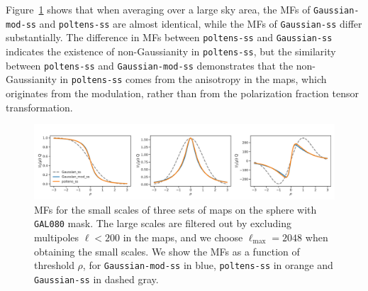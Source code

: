 \documentclass[twocolumn]{aastex631}
\begin{document}
Figure~\ref{fig:MF:sphere} shows that when averaging over a large sky area, the MFs of \texttt{Gaussian-mod-ss} and \texttt{poltens-ss} are almost identical, while the MFs of \texttt{Gaussian-ss} differ substantially. The difference in MFs between \texttt{poltens-ss} and \texttt{Gaussian-ss} indicates the existence of non-Gaussianity in \texttt{poltens-ss}, but the similarity between \texttt{poltens-ss} and \texttt{Gaussian-mod-ss} demonstrates that the non-Gaussianity in \texttt{poltens-ss} comes from the anisotropy in the maps, which originates from the modulation, rather than from the polarization fraction tensor transformation.

\begin{figure}
    \centering
    \includegraphics[width=180mm]{figures/MFs_80p_sky_Q.pdf}
    \caption{MFs for the small scales of three sets of maps on the sphere with \texttt{GAL080} mask. The large scales are filtered out by excluding multipoles $\ell < 200$ in the maps, and we choose $\ell_\text{max} = 2048$ when obtaining the small scales. We show the MFs as a function of threshold $\rho$, for \texttt{Gaussian-mod-ss} in blue, \texttt{poltens-ss} in orange and \texttt{Gaussian-ss} in dashed gray.}
    \label{fig:MF:sphere}
\end{figure}
\end{document}
